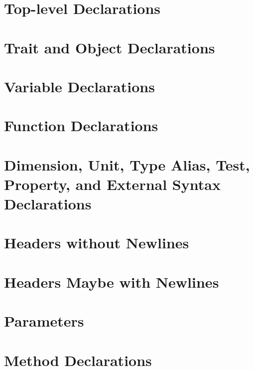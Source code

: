 \section{Top-level Declarations}


\section{Trait and Object Declarations}


\section{Variable Declarations}


\section{Function Declarations}


\section{Dimension, Unit, Type Alias, Test, Property, and External Syntax
  Declarations}


\section{Headers without Newlines}


\section{Headers Maybe with Newlines}


\section{Parameters}


\section{Method Declarations}


